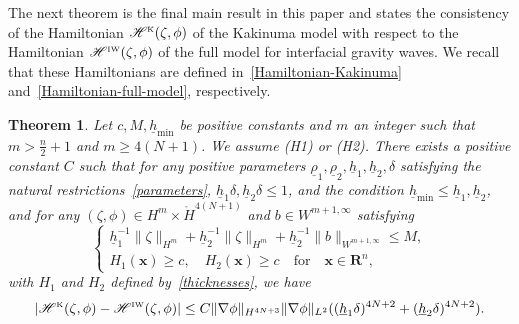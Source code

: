 \documentclass[11pt,leqno]{article}
\newtheorem{theorem}{\bf Theorem}[section]
\numberwithin{equation}{section}
\numberwithin{figure}{section}
\begin{document}
The next theorem is the final main result in this paper and states the consistency of the Hamiltonian 
$\mathscr{H}^{\mbox{\rm\tiny K}}(\zeta,\phi)$ of the Kakinuma model 
with respect to the Hamiltonian $\mathscr{H}^{\mbox{\rm\tiny IW}}(\zeta,\phi)$ of the full model for interfacial gravity waves. 
We recall that these Hamiltonians are defined in~\eqref{Hamiltonian-Kakinuma} and~\eqref{Hamiltonian-full-model}, respectively.


\begin{theorem}\label{theorem-Hamiltonian}
Let $c, M, \underline{h}_\mathrm{min}$ be positive constants and $m$ an integer such that $m>\frac{n}{2}+1$ and $m \geq 4(N+1)$. 
We assume {\rm (H1)} or {\rm (H2)}. 
There exists a positive constant $C$ such that for any positive parameters 
$\underline{\rho}_1, \underline{\rho}_2, \underline{h}_1, \underline{h}_2, \delta$ satisfying the natural 
restrictions~\eqref{parameters}, $\underline{h}_1\delta, \underline{h}_2\delta \leq 1$, and the condition 
${\underline{h}_\mathrm{min} \leq \underline{h}_1, \underline{h}_2}$, and for any 
$(\zeta,\phi)\in H^m\times\mathring{H}^{4(N+1)}$ and $b\in W^{m+1,\infty}$ satisfying 
%
\[
\begin{cases}
 \underline{h}_1^{-1}\|\zeta\|_{H^m} + \underline{h}_2^{-1}\|\zeta\|_{H^m}
  + \underline{h}_2^{-1}\|b\|_{W^{m+1,\infty}} \leq M, \\
 H_1(\bm{x})\geq c, \quad H_2(\bm{x})\geq c \quad\mbox{for}\quad \bm{x}\in\mathbf{R}^n,
\end{cases}
\]
%
with $H_1$ and $H_2$ defined by~\eqref{thicknesses}, we have 
%
\[
|\mathscr{H}^{\mbox{\rm\tiny K}}(\zeta,\phi)-\mathscr{H}^{\mbox{\rm\tiny IW}}(\zeta,\phi)|
\leq C\|\nabla\phi\|_{H^{4N+3}}\|\nabla\phi\|_{L^2}
 ((\underline{h}_1\delta)^{4N+2}+(\underline{h}_2\delta)^{4N+2}).
\]
\end{theorem}


\end{document}
